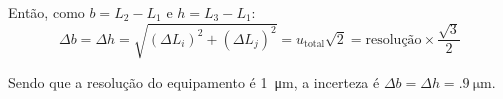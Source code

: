 Então, como $b = L_2 - L_1$ e $h = L_3 - L_1$:
\begin{equation*}
    \Delta b = \Delta h = \sqrt{(\Delta L_i)^2 + (\Delta L_j)^2} = u_\text{total} \sqrt{2} = \text{resolução} \times \frac{\sqrt{3}}{2}
\end{equation*}

Sendo que a resolução do equipamento é \SI{1}{\micro\meter}, a incerteza é $\Delta b = \Delta h = \SI{.9}{\micro\meter}$.

